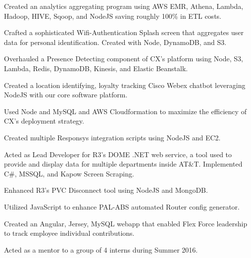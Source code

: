 \documentclass[]{deedy-resume-openfont}
\begin{document}
\begin{minipage}[t]{0.66\textwidth}
\begin{tightemize}
\item Created an analytics aggregating program using AWS EMR, Athena, Lambda, Hadoop, HIVE, Sqoop, and NodeJS  saving roughly 100\% in ETL costs.
\item Crafted a sophisticated Wifi-Authentication Splash screen that aggregates user data for personal identification. Created with Node, DynamoDB, and S3.
\item Overhauled a Presence Detecting component of CX's platform using Node, S3, Lambda, Redis, DynamoDB, Kinesis, and Elastic Beanstalk.
\item Created a location identifying, loyalty tracking Cisco Webex chatbot leveraging NodeJS with our core software platform.
\item Used Node and MySQL and AWS Cloudformation to maximize the efficiency of CX's deployment strategy.
\item Created multiple Responsys integration scripts using NodeJS and EC2.
\end{tightemize}
\sectionsep

\begin{tightemize}
\item Acted as Lead Developer for R3’s DOME .NET web service, a tool used to provide and display data for multiple departments inside AT\&T. Implemented C\#, MSSQL, and Kapow Screen Scraping.
\item Enhanced R3's PVC Disconnect tool using NodeJS and MongoDB.
\item Utilized JavaScript to enhance PAL-ABS automated Router config generator.
\item Created an Angular, Jersey, MySQL webapp that enabled Flex Force leadership to track employee individual contributions.
\item Acted as a mentor to a group of 4 interns during Summer 2016.
\end{tightemize}
\sectionsep


\sectionsep




\end{minipage}
\end{document}

